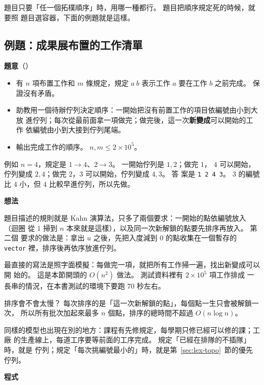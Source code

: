 題目只要「任一個拓樸順序」時，用哪一種都行。 題目把順序規定死的時候，就要照
題目選容器，下面的例題就是這樣。

\subsection{例題：成果展布置的工作清單}
\label{sec:ex-checklist}

\textbf{題意}（）

\begin{itemize}
\item 有 $n$ 項布置工作和 $m$ 條規定，規定 $a\ b$ 表示工作 $a$ 要在工作 $b$
之前完成。 保證沒有矛盾。
\item 助教用一個待辦佇列決定順序：一開始把沒有前置工作的項目依編號由小到大放
進佇列；每次從最前面拿一項做完；做完後，這一次\textbf{新變成}可以開始的工作
依編號由小到大接到佇列尾端。
\item 輸出完成工作的順序。 $n, m \le 2 \times 10^5$。
\end{itemize}

例如 $n = 4$，規定是 $1 \to 4$、$2 \to 3$。 一開始佇列是 $1, 2$；做完 $1$，
$4$ 可以開始，佇列變成 $2, 4$；做完 $2$，$3$ 可以開始，佇列變成 $4, 3$。 答
案是 \texttt{1 2 4 3}。 $3$ 的編號比 $4$ 小，但 $4$ 比較早進佇列，所以先做。

\textbf{想法}

題目描述的規則就是 Kahn 演算法，只多了兩個要求：一開始的點依編號放入（迴圈
從 $1$ 掃到 $n$ 本來就是這樣），以及同一次新解鎖的點要先排序再放入。 第二個
要求的做法是：拿出 $u$ 之後，先把入度減到 $0$ 的點收集在一個暫存的
\texttt{vector} 裡，排序後再依序放進佇列。

最直接的寫法是照字面模擬：每做完一項，就把所有工作掃一遍，找出新變成可以開
始的。 這是本節開頭的 $O(n^2)$ 做法。 測試資料裡有 $2 \times 10^5$ 項工作排成
一長串的情況，在本書測試的環境下要跑 $70$ 秒左右。

排序會不會太慢？ 每次排序的是「這一次新解鎖的點」，每個點一生只會被解鎖一次，
所以所有批次加起來最多 $n$ 個點，排序的總時間不超過 $O(n \log n)$。

同樣的模型也出現在別的地方：課程有先修規定，每學期只修已經可以修的課；工廠
的生產線上，每道工序要等前面的工序完成。 規定「已經在排隊的不插隊」時，就是
佇列；規定「每次挑編號最小的」時，就是第~\ref{sec:lex-topo}~節的優先佇列。

\textbf{程式}

